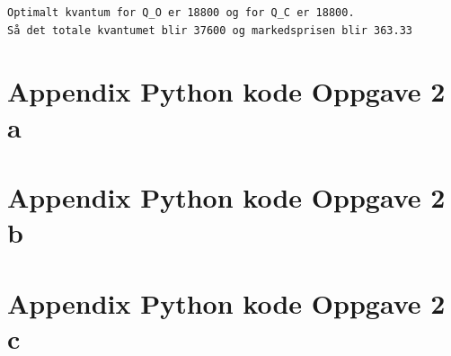 \documentclass[
  12pt,
  a4paper,
  DIV=11,
  numbers=noendperiod]{scrartcl}
\begin{document}
\begin{verbatim}
Optimalt kvantum for Q_O er 18800 og for Q_C er 18800. 
Så det totale kvantumet blir 37600 og markedsprisen blir 363.33
\end{verbatim}

\clearpage

\section {Appendix Python kode Oppgave 2 a}

\clearpage

\section {Appendix Python kode Oppgave 2 b}

\clearpage

\section {Appendix Python kode Oppgave 2 c}
\end{document}
